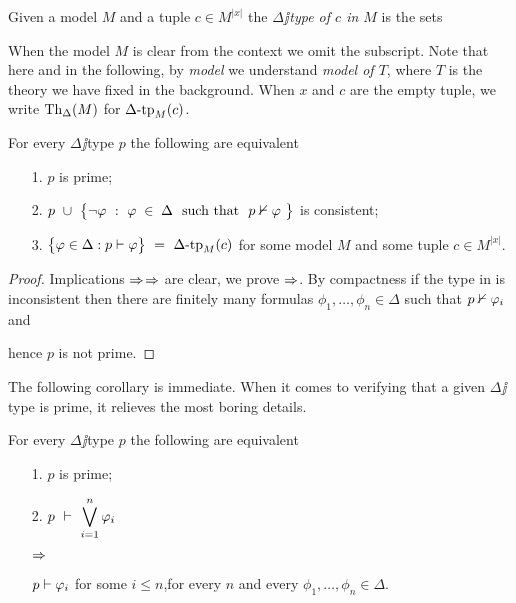 \documentclass[creche.tex]{subfiles}
\begin{document}
Given a model $M$ and a tuple $c\in M^{|x|}$ the \emph{$\Delta\jj$type of $c$ in $M$\/} is the sets


When the model $M$ is clear from the context we omit the subscript. Note that here and in the following, by \textit{model\/} we understand \textit{model of $T$}, where $T$ is the theory we have fixed in the background. When $x$ and $c$ are the empty tuple, we write \emph{$\textrm{Th}_\Delta(M)$} for $\Delta\mbox{-}\textrm{tp}_M(c)$.

\begin{lemma}\label{lemmatipiprimiconsistenti}
For every $\Delta\jj$type $p$ the following are equivalent
\begin{itemize}
\item[1.] $p$ is prime;
\item[2.] $p\ \cup\ \big\{\neg\phi\ :\  \phi\;\in\;\Delta\ \ \textrm{such that}\ \ p\notproves\phi\ \big\}$ is consistent;
\item[3.] $\big\{\phi\in\Delta : p\proves\phi\big\}\ = \ \Deltatp_M(c)$ for some model $M$ and some tuple $c\in M^{|x|}$.
\end{itemize}
\end{lemma}
\begin{proof} 
Implications $\Rightarrow$$\Rightarrow$ are clear, we prove $\Rightarrow$. By compactness if the type in  is inconsistent then there are finitely many formulas $\phi_1,\dots,\phi_n\in\Delta$ such that $p\nvdash\varphi_i$ and 


hence $p$ is not prime.
\end{proof}

The following corollary is immediate. When it comes to verifying that a given $\Delta\jj$type is prime, it relieves the most boring details.

\begin{corollary}\label{coroll_test_primalita}
For every $\Delta\jj$type $p$ the following are equivalent
\begin{itemize}
\item[1.] $p$ is prime;
\item[2.] $\displaystyle p\ \proves\ \bigvee^n_{i=1}\phi_i$\parbox{6ex}{\hfil$\Rightarrow$}$p\vdash\varphi_i$ for some $i\le n$,\hfill for every $n$ and every $\phi_1,\dots,\phi_n\in\Delta$.\QED
\end{itemize}
\end{corollary}
\end{document}
